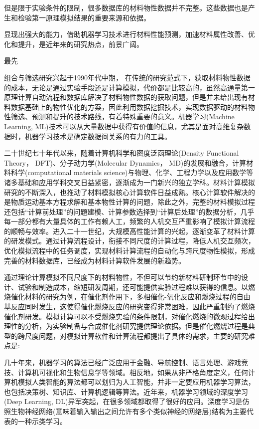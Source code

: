 但是限于实验条件的限制，很多数据库的材料物性数据并不完整。这些数据也是产生和检验第一原理模拟结果的重要来源和依据。

显现出强大的能力，借助机器学习技术进行材料性能预测，加速材料属性改善、优化和提升，是近年来的研究热点，前景广阔。


最先

组合与筛选研究兴起于1990年代中期，
在传统的研究范式下，获取材料物性数据的成本，无论是通过实验手段还是计算模拟，代价都是比较高的，虽然高通量第一原理计算自动流程和数据库解决了材料物性数据的获取问题，但是并未给出现有材料数据基础上的物性优化的方案，因此利用数据挖掘技术，实现数据驱动的材料物性筛选、预测和提升的技术路线，有着特殊重要的意义。机器学习\textrm{(Machine Learning, ML)}技术可以从大量数据中获得有价值的信息，尤其是面对高维复杂数据时，机器学习技术是确定数据间关系的有力的工具。


二十世纪七十年代以来，随着计算机科学和密度泛函理论\textrm{(Density Functional Theory， DFT)}、分子动力学\textrm{(Molecular Dynamics， MD)}的发展和融合，计算材料科学\textrm{(computational materials science)}与物理、化学、工程力学以及应用数学等诸多基础和应用学科交叉日益紧密，逐渐成为一门新兴的独立学科。材料计算模拟研究的不断深入，也推动了材料模拟核心计算软件日益成熟。核心计算软件解决的是物质运动基本方程求解和基本物性计算的问题，除此之外，完整的材料模拟过程还包括“计算前处理”的问题建模、计算参数选择到“计算后处理”的数据分析，几乎每一部分都有大量具体的工作有赖人工，频繁的人机交互严重影响了模拟计算流程的顺畅与效率。进入二十一世纪，大规模高性能计算的兴起，逐渐变革了材料计算的研发模式。通过计算流程设计，衔接不同尺度的计算过程，降低人机交互频次，优化模拟流程中的任务调度，实现材料计算流程的自动化与跨尺度物性模拟，形成完善的材料数据库，已经成为材料计算软件发展的新趋势。

通过理论计算模拟不同尺度下的材料物性，不但可以节约新材料研制环节中的设计、试验和制造成本，缩短研发周期，还可能提供实验过程难以获得的信息。以燃烧催化材料的研究为例，在催化剂作用下，多相催化-氧化反应和燃烧过程的自由基反应同时发生，这使得催化燃烧反应的研究变得非常困难，因此严重制约了燃烧催化剂研发。模拟计算可以不受燃烧实验的条件限制，对催化燃烧的微观过程给出理性的分析，为实验制备与合成催化剂研究提供理论依据。但是催化燃烧过程是典型的跨尺度问题，对模拟计算软件和计算流程都提出了具体的需求，主要的研究难点是:




几十年来，机器学习的算法已经广泛应用于金融、导航控制、语言处理、游戏竞技、计算机可视化和生物信息学等领域。相反地，如果从非严格角度定义，任何计算机模拟人类智能的算法都可以划归为人工智能，并非一定要应用机器学习算法，也包括决策树、知识库、计算机逻辑等算法。近年来，机器学习领域的深度学习\textrm{(Deep Learning, DL)}异军突起，在很多领域都取得了很好的应用。深度学习是仿照生物神经网络(意味着输入输出之间允许有多个类似神经的网络层)结构为主要代表的一种示类学习。
